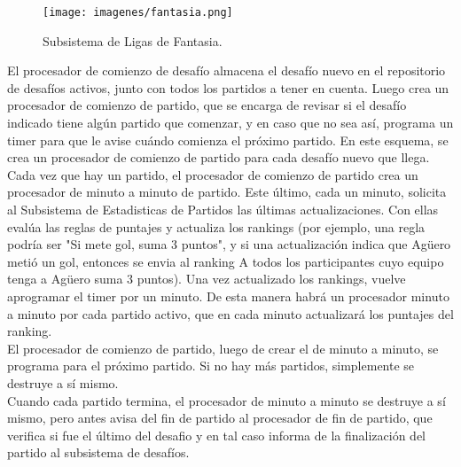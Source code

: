 \begin{figure}[H]
  \centering
  \texttt{[image: imagenes/fantasia.png]}
  \caption{Subsistema de Ligas de Fantasia.}
\end{figure}

El procesador de comienzo de desafío almacena el desafío nuevo en el repositorio de desafíos activos, junto con todos los partidos a tener en cuenta.
Luego crea un procesador de comienzo de partido, que se encarga de revisar si el desafío indicado tiene algún partido que comenzar, y en caso que no sea así, programa un timer para
que le avise cuándo comienza el próximo partido. En este esquema, se crea un procesador de comienzo de partido para cada desafío nuevo que llega.
Cada vez que hay un partido, el procesador de comienzo de partido crea un procesador de minuto a minuto de partido. Este último, cada un minuto,
solicita al Subsistema de Estadisticas de Partidos las últimas actualizaciones. Con ellas evalúa las reglas de puntajes y actualiza los rankings (por ejemplo, una regla podría ser "Si mete gol, suma 3 puntos", y si una actualización
indica que Agüero metió un gol, entonces se envia al ranking A todos los participantes cuyo equipo tenga a Agüero suma 3 puntos).
Una vez actualizado los rankings, vuelve aprogramar el timer por un minuto. De esta manera habrá un procesador minuto a minuto por cada partido activo, que en cada minuto
actualizará los puntajes del ranking.\\

El procesador de comienzo de partido, luego de crear el de minuto a minuto, se programa
para el próximo partido. Si no hay más partidos, simplemente se destruye a sí mismo.\\

Cuando cada partido termina, el procesador de minuto a minuto se destruye a sí mismo, pero antes avisa del fin de partido al procesador de fin de partido, que verifica si
fue el último del desafio y en tal caso informa de la finalización del partido al subsistema de desafíos.

